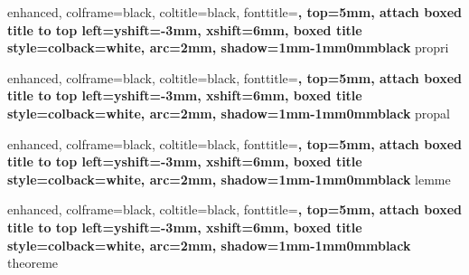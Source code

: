 \RequirePackage{amsthm}
\RequirePackage{amsmath}
\RequirePackage{amssymb}
\RequirePackage{tcolorbox}



\newtheorem{_definition}{Définition}[section]
\newenvironment{definition}[1][]{
    \begin{tcolorbox}[
        sharp corners,
        colback=white,
        colframe=black,
        leftrule=1mm,
        toprule=-1mm, bottomrule=-1mm, rightrule=-1mm,
        top=0mm, left=1mm
    ]
    \begin{_definition}#1~\par
}{%
    \end{_definition}%
    \end{tcolorbox}
}

%
{
    enhanced,
    colframe=black,
    coltitle=black, fonttitle=\bfseries,
    top=5mm,
    attach boxed title to top left={yshift=-3mm, xshift=6mm},
    boxed title style={colback=white, arc=2mm, shadow={1mm}{-1mm}{0mm}{black}}
}{propri}

%
{
    enhanced,
    colframe=black,
    coltitle=black, fonttitle=\bfseries,
    top=5mm,
    attach boxed title to top left={yshift=-3mm, xshift=6mm},
    boxed title style={colback=white, arc=2mm, shadow={1mm}{-1mm}{0mm}{black}}
}{propal}

%
{
    enhanced,
    colframe=black,
    coltitle=black, fonttitle=\bfseries,
    top=5mm,
    attach boxed title to top left={yshift=-3mm, xshift=6mm},
    boxed title style={colback=white, arc=2mm, shadow={1mm}{-1mm}{0mm}{black}}
}{lemme}

%
{
    enhanced,
    colframe=black,
    coltitle=black, fonttitle=\bfseries,
    top=5mm,
    attach boxed title to top left={yshift=-3mm, xshift=6mm},
    boxed title style={colback=white, arc=2mm, shadow={1mm}{-1mm}{0mm}{black}}
}{theoreme}

\newtheorem{_demonstration}{Démonstration}[section]
\newenvironment{demonstration}[1][]{
    \begin{_demonstration}[#1]~\par
}{%
    \end{_demonstration}%
    \qed%
}

\newtheorem{exemple}{Exemple}[section]

\newtheorem{remarque}{Remarque}[section]

\newenvironment{methode}[1][]{
    \begin{tcolorbox}[
        leftrule=-1mm, toprule=-1mm, bottomrule=-1mm, rightrule=-1mm,
    ]
    \textbf{Point méthode.}\space
}{
    \end{tcolorbox}
}